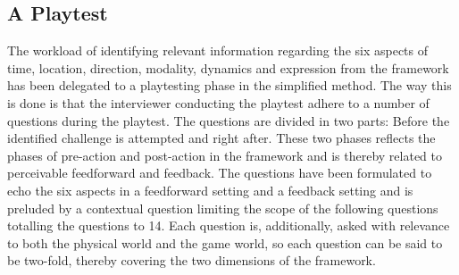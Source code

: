 \subsection{A Playtest}
The workload of identifying relevant information regarding the six aspects of time, location, direction, modality, dynamics and expression from the framework has been delegated to a playtesting phase in the simplified method. The way this is done is that the interviewer conducting the playtest adhere to a number of questions during the playtest. The questions are divided in two parts: Before the identified challenge is attempted and right after. These two phases reflects the phases of pre-action and post-action in the framework and is thereby related to perceivable feedforward and feedback. The questions have been formulated to echo the six aspects in a feedforward setting and a feedback setting and is preluded by a contextual question limiting the scope of the following questions totalling the questions to 14. Each question is, additionally, asked with relevance to both the physical world and the game world, so each question can be said to be two-fold, thereby covering the two dimensions of the framework.


